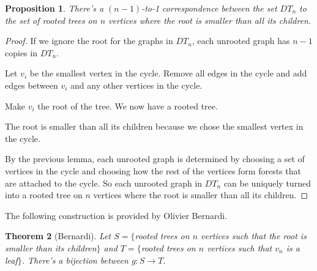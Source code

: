 \documentclass[11pt]{amsart}
\newtheorem{thm}{Theorem}[section]
\newtheorem{prop}[thm]{Proposition}%
\begin{document}
\begin{prop}
    There's a $(n-1)$-to-1 correspondence between the set $DT_n$ to the set of rooted trees on $n$ vertices where the root is smaller than all its children.
\end{prop}

\begin{proof}
    If we ignore the root for the graphs in $DT_n$, each unrooted graph has $n-1$ copies in $DT_n$.

    Let $v_i$ be the smallest vertex in the cycle. Remove all edges in the cycle and add edges between $v_i$ and any other vertices in the cycle.

    Make $v_i$ the root of the tree. We now have a rooted tree.

    The root is smaller than all its children because we chose the smallest vertex in the cycle.

    By the previous lemma, each unrooted graph is determined by choosing a set of vertices in the cycle and choosing how the rest of the vertices form forests that are attached to the cycle. So each unrooted graph in $DT_n$ can be uniquely turned into a rooted tree on $n$ vertices where the root is smaller than all its children.
\end{proof}

The following construction is provided by Olivier Bernardi.

\begin{thm}[Bernardi] \label{Bernardi}
    Let $S=\{$rooted trees on $n$ vertices such that the root is smaller than its children$\}$ and 
    $T=\{$rooted trees on $n$ vertices such that $v_n$ is a leaf$\}$. There's a bijection between $g: S \rightarrow T$.
\end{thm}
\end{document}
